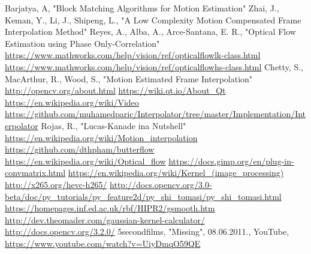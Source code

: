 \begin{thebibliography}{30}
Barjatya, A, "Block Matching Algorithms for Motion Estimation"
Zhai, J., Keman, Y., Li, J., Shipeng, L., "A Low Complexity Motion Compensated Frame Interpolation Method"
Reyes, A., Alba, A., Arce-Santana, E. R., "Optical Flow Estimation using Phase Only-Correlation"
\url{https://www.mathworks.com/help/vision/ref/opticalflowlk-class.html}
\url{https://www.mathworks.com/help/vision/ref/opticalflowhs-class.html}
Chetty, S., MacArthur, R., Wood, S., "Motion Estimated Frame Interpolation"
\url{http://opencv.org/about.html}
\url{https://wiki.qt.io/About_Qt}
\url{https://en.wikipedia.org/wiki/Video}
\url{https://github.com/muhamedparic/Interpolator/tree/master/Implementation/Interpolator}
Rojas, R., "Lucas-Kanade ina Nutshell"
\url{https://en.wikipedia.org/wiki/Motion_interpolation}
\url{https://github.com/dthpham/butterflow}
\url{https://en.wikipedia.org/wiki/Optical_flow}
\url{https://docs.gimp.org/en/plug-in-convmatrix.html}
\url{https://en.wikipedia.org/wiki/Kernel_(image_processing)}
\url{http://x265.org/hevc-h265/}
\url{http://docs.opencv.org/3.0-beta/doc/py_tutorials/py_feature2d/py_shi_tomasi/py_shi_tomasi.html}
\url{https://homepages.inf.ed.ac.uk/rbf/HIPR2/gsmooth.htm}
\url{http://dev.theomader.com/gaussian-kernel-calculator/}
\url{http://docs.opencv.org/3.2.0/}
5secondfilms, "Missing", 08.06.2011., YouTube, \url{https://www.youtube.com/watch?v=UiyDmqO59QE}
\end{thebibliography}